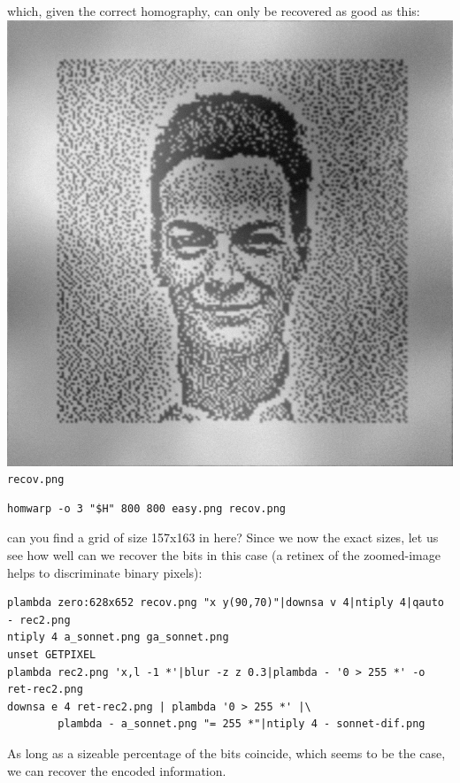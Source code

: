 which, given the correct  homography, can only be recovered as good as this:
\includegraphics{recov.png}\verb+recov.png+
\begin{verbatim}
homwarp -o 3 "$H" 800 800 easy.png recov.png
\end{verbatim}
can you find a grid of size 157x163 in here?  Since we now the exact sizes,
let us see how well can we recover the bits in this case (a retinex of the
zoomed-image helps to discriminate binary pixels):

\begin{verbatim}
plambda zero:628x652 recov.png "x y(90,70)"|downsa v 4|ntiply 4|qauto - rec2.png
ntiply 4 a_sonnet.png ga_sonnet.png
unset GETPIXEL
plambda rec2.png 'x,l -1 *'|blur -z z 0.3|plambda - '0 > 255 *' -o ret-rec2.png
downsa e 4 ret-rec2.png | plambda '0 > 255 *' |\
        plambda - a_sonnet.png "= 255 *"|ntiply 4 - sonnet-dif.png
\end{verbatim}
\begin{gallery}
\end{gallery}

As long as a sizeable percentage of the bits coincide, which seems to be the
case, we can recover the
encoded information.

